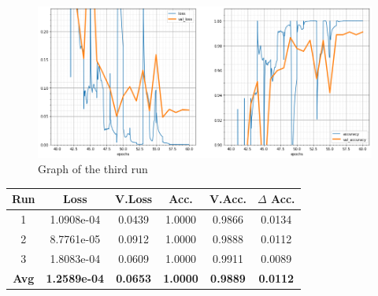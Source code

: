 \begin{figure}[H]
	\begin{center}
	\includegraphics[width=\linewidth]{Immagini/conv-3}
	\caption{Graph of the third run}
	\end{center}
\end{figure}
\begin{table}[H]
	\centering
	\begin{tabular}{cccccc}
		\textbf{Run} &\textbf{Loss}&\textbf{V.Loss} &\textbf{Acc.}&\textbf{V.Acc.}&\textbf{$\Delta$ Acc.} \\ \hline
		1   & 1.0908e-04    &   0.0439  & 1.0000    & 0.9866    & 0.0134 \\
		2   & 8.7761e-05    &   0.0912  & 1.0000    & 0.9888    & 0.0112 \\
		3   & 1.8083e-04    &   0.0609  & 1.0000    & 0.9911    & 0.0089 \\
		\textbf{Avg} & \textbf{1.2589e-04} & \textbf{0.0653}	& \textbf{1.0000}	& \textbf{0.9889} 	& \textbf{0.0112} 
	\end{tabular}
\end{table}




